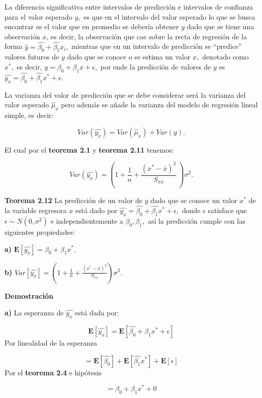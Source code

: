 \documentclass[
  a4paper,
  oneside,
  openany]{book}
\begin{document}
La diferencia significativa entre intervalos de predicción e intervalos de confianza para el valor esperado \(y,\) es que en el intervalo del valor esperado lo que se busca encontrar es el valor que en promedio se debería obtener \(y\) dado que se tiene una observación \(x\), es decir, la observación que cae sobre la recta de regresión de la forma \(\hat{y}=\hat{\beta_{0}}+\hat{\beta_{1}}x_{i},\) mientras que en un intervalo de predicción se ``predice'' valores futuros de \(y\) dado que se conoce o se estima un valor \(x,\) denotado como \(x^*,\) es decir, \(y=\beta_{0}+\beta_{1}x+\epsilon,\) por ende la predicción de valores de \(y\) es \(\hat{y_{x}}=\hat{\beta_{0}}+\hat{\beta_{1}}x^*+\epsilon\).

La varianza del valor de predicción que se debe considerar será la varianza del valor esperado \(\hat{\mu}_{x}\) pero además se añade la varianza del modelo de regresión lineal simple, es decir:

\[Var(\hat{y_{x}})=Var(\hat{\mu}_x)+Var(y).\]

El cual por el \textbf{teorema 2.1} y \textbf{teorema 2.11} tenemos:

\[Var(\hat{y_{x}})=\left( 1+ \frac{1}{n}+\frac{(x^*-\overline{x})^2}{S_{xx}} \ \right)\sigma^2.\]

\textbf{Teorema 2.12} La predicción de un valor de \(y\) dado que se conoce un valor \(x^*\) de la variable regresora \(x\) está dado por \(\hat{y_{x}}=\hat{\beta_{0}}+\hat{\beta_{1}}x^*+\epsilon,\) donde \(\epsilon\) satisface que \(\epsilon\sim N(0,\sigma^2)\) e independientemente a \(\beta_{0},\beta_{1},\) así la predicción cumple con las siguientes propiedades:

\textbf{a)} \(\mathbf{E}\left[\hat{y_{x}}\right]=\beta_{0}+\beta_{1}x^*.\)

\textbf{b)} \(Var\left[\hat{y_{x}}\right]=\left(1+ \frac{1}{n}+\frac{(x^*-\overline{x})^2}{S_{xx}}\right)\sigma^2.\)

\textbf{Demostración}

\textbf{a)} La esperanza de \(\hat{y_{x}}\) está dada por:

\[\mathbf{E}\left[\hat{y_{x}}\right]=\mathbf {E}\left[\hat{\beta_{0}}+\hat{\beta_{1}}x^*+ \epsilon\right]\]
Por linealidad de la esperanza

\[=\mathbf{E}\left[\hat{\beta_{0}}\right]+\mathbf{E}\left[\hat{\beta_{1}}x^*\right]+ \mathbf{E}\left[\epsilon\right]\]
Por el \textbf{teorema 2.4} e hipótesis

\[=\beta_{0}+\beta_{1}x^*+0\]
\end{document}

